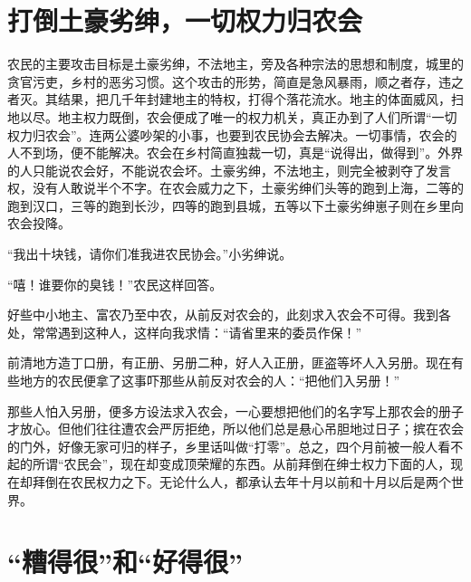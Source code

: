 \section{打倒土豪劣绅，一切权力归农会}

农民的主要攻击目标是土豪劣绅，不法地主，旁及各种宗法的思想和制度，城里的贪官污吏，乡村的恶劣习惯。这个攻击的形势，简直是急风暴雨，顺之者存，违之者灭。其结果，把几千年封建地主的特权，打得个落花流水。地主的体面威风，扫地以尽。地主权力既倒，农会便成了唯一的权力机关，真正办到了人们所谓“一切权力归农会”。连两公婆吵架的小事，也要到农民协会去解决。一切事情，农会的人不到场，便不能解决。农会在乡村简直独裁一切，真是“说得出，做得到”。外界的人只能说农会好，不能说农会坏。土豪劣绅，不法地主，则完全被剥夺了发言权，没有人敢说半个不字。在农会威力之下，土豪劣绅们头等的跑到上海，二等的跑到汉口，三等的跑到长沙，四等的跑到县城，五等以下土豪劣绅崽子则在乡里向农会投降。

“我出十块钱，请你们准我进农民协会。”小劣绅说。

“嘻！谁要你的臭钱！”农民这样回答。

好些中小地主、富农乃至中农，从前反对农会的，此刻求入农会不可得。我到各处，常常遇到这种人，这样向我求情：“请省里来的委员作保！”

前清地方造丁口册，有正册、另册二种，好人入正册，匪盗等坏人入另册。现在有些地方的农民便拿了这事吓那些从前反对农会的人：“把他们入另册！”

那些人怕入另册，便多方设法求入农会，一心要想把他们的名字写上那农会的册子才放心。但他们往往遭农会严厉拒绝，所以他们总是悬心吊胆地过日子；摈在农会的门外，好像无家可归的样子，乡里话叫做“打零”。总之，四个月前被一般人看不起的所谓“农民会”，现在却变成顶荣耀的东西。从前拜倒在绅士权力下面的人，现在却拜倒在农民权力之下。无论什么人，都承认去年十月以前和十月以后是两个世界。

\section{“糟得很”和“好得很”}


